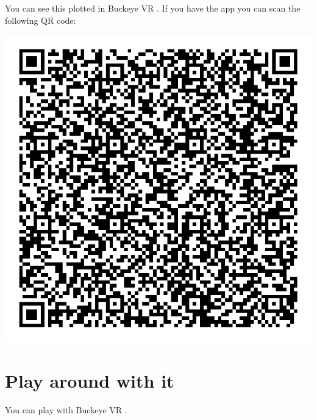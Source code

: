\documentclass{ximera}
\begin{document}
You can see this plotted in Buckeye VR
.
If you have the app you can scan the following QR code:
\begin{image}
\includegraphics{bvrQR3.png}  
\end{image}

\section{Play around with it}
You can play with Buckeye VR 
.
\end{document}
